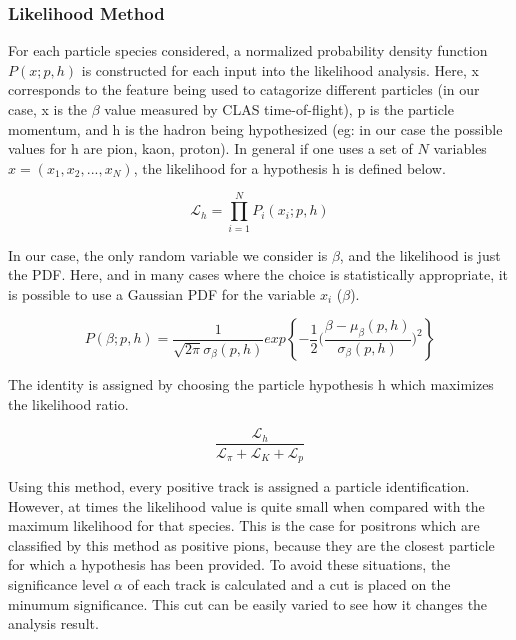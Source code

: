 \subsubsection{Likelihood Method}

For each particle species considered, a normalized probability density function $P(x;p,h)$ is constructed for each input into the likelihood analysis.  Here, x corresponds to the feature being used to catagorize different particles (in our case, x is the $\beta$ value measured by CLAS time-of-flight), p is the particle momentum, and h is the hadron being hypothesized (eg: in our case the possible values for h are pion, kaon, proton).  In general if one uses a set of $N$ variables $x = (x_1, x_2, ..., x_N)$, the likelihood for a hypothesis h is defined below.

\begin{equation}
  \mathcal{L}_h = \prod^{N}_{i=1} P_{i} (x_i; p, h)
\end{equation}

In our case, the only random variable we consider is $\beta$, and the likelihood is just the PDF.  Here, and in many cases where the choice is statistically appropriate, it is possible to use a Gaussian PDF for the variable $x_i$ ($\beta$).

\begin{equation}
  P(\beta;p,h) = \frac{1}{\sqrt{2 \pi} \sigma_\beta(p,h) } exp \left \{ -\frac{1}{2} \bigg( \frac{\beta - \mu_\beta(p,h)}{\sigma_\beta(p,h)} \bigg)^2 \right \}
\end{equation}

The identity is assigned by choosing the particle hypothesis h which maximizes the likelihood ratio.

\begin{equation}
  \frac{\mathcal{L}_h}{\mathcal{L}_{\pi}+\mathcal{L}_{K}+\mathcal{L}_{p}}
\end{equation}

Using this method, every positive track is assigned a particle identification.  However, at times the likelihood value is quite small when compared with the maximum likelihood for that species.  This is the case for positrons which are classified by this method as positive pions, because they are the closest particle for which a hypothesis has been provided.  To avoid these situations, the significance level $\alpha$ of each track is calculated and a cut is placed on the minumum significance.  This cut can be easily varied to see how it changes the analysis result.

